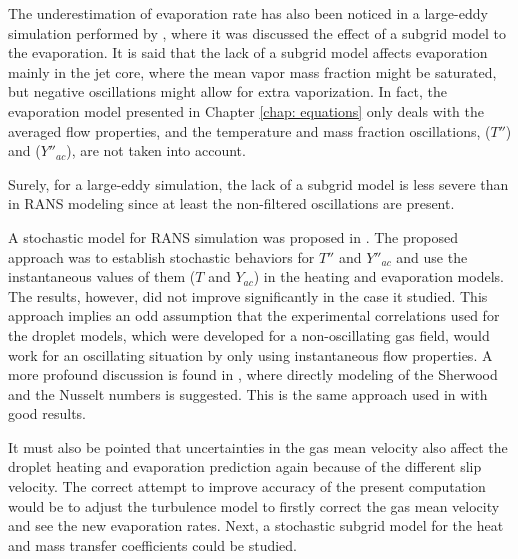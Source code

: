 The underestimation of evaporation rate has also been noticed in a large-eddy simulation performed by \cite{bini}, where it was discussed the effect of a subgrid model to the evaporation. It is said that the lack of a subgrid model affects evaporation mainly in the jet core, where the mean vapor mass fraction might be saturated, but negative oscillations might allow for extra vaporization. In fact, the evaporation model presented in Chapter \ref{chap: equations} only deals with the averaged flow properties, and the temperature and mass fraction oscillations, ($T''$) and ($Y''_{ac}$), are not taken into account.

Surely, for a large-eddy simulation, the lack of a subgrid model is less severe than in RANS modeling since at least the non-filtered oscillations are present. 

A stochastic model for RANS simulation was proposed in \cite{santanu}. The proposed approach was to establish stochastic behaviors for $T''$ and $Y''_{ac}$ and use the instantaneous values of them ($T$ and $Y_{ac}$) in the heating and evaporation models. The results, however, did not improve significantly in the case it studied. This approach implies an odd assumption that the experimental correlations used for the droplet models, which were developed for a non-oscillating gas field, would work for an oscillating situation by only using instantaneous flow properties. A more profound discussion is found in \cite{sirignano}, where directly modeling of the Sherwood and the Nusselt numbers is suggested. This is the same approach used in \cite{bini} with good results.

It must also be pointed that uncertainties in the gas mean velocity also affect the droplet heating and evaporation prediction again because of the different slip velocity. The correct attempt to improve accuracy of the present computation would be to adjust the turbulence model to firstly correct the gas mean velocity and see the new evaporation rates. Next, a stochastic subgrid model for the heat and mass transfer coefficients could be studied.

